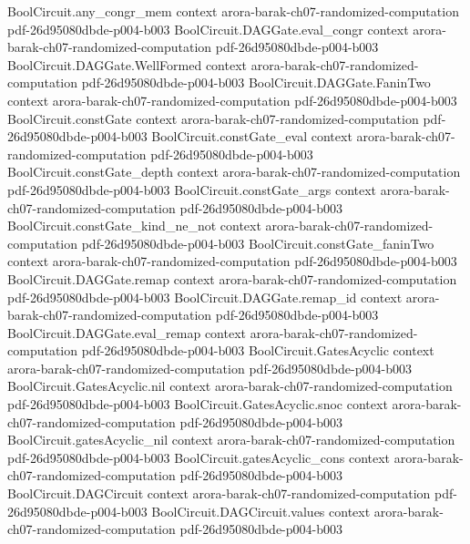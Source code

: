 \begin{theorem}
  {BoolCircuit.any_congr_mem}
  {context}
  {arora-barak-ch07-randomized-computation}
  {pdf-26d95080dbde-p004-b003}
\proofstep
  {BoolCircuit.DAGGate.eval_congr}
  {context}
  {arora-barak-ch07-randomized-computation}
  {pdf-26d95080dbde-p004-b003}
\proofstep
  {BoolCircuit.DAGGate.WellFormed}
  {context}
  {arora-barak-ch07-randomized-computation}
  {pdf-26d95080dbde-p004-b003}
\proofstep
  {BoolCircuit.DAGGate.FaninTwo}
  {context}
  {arora-barak-ch07-randomized-computation}
  {pdf-26d95080dbde-p004-b003}
\proofstep
  {BoolCircuit.constGate}
  {context}
  {arora-barak-ch07-randomized-computation}
  {pdf-26d95080dbde-p004-b003}
\proofstep
  {BoolCircuit.constGate_eval}
  {context}
  {arora-barak-ch07-randomized-computation}
  {pdf-26d95080dbde-p004-b003}
\proofstep
  {BoolCircuit.constGate_depth}
  {context}
  {arora-barak-ch07-randomized-computation}
  {pdf-26d95080dbde-p004-b003}
\proofstep
  {BoolCircuit.constGate_args}
  {context}
  {arora-barak-ch07-randomized-computation}
  {pdf-26d95080dbde-p004-b003}
\proofstep
  {BoolCircuit.constGate_kind_ne_not}
  {context}
  {arora-barak-ch07-randomized-computation}
  {pdf-26d95080dbde-p004-b003}
\proofstep
  {BoolCircuit.constGate_faninTwo}
  {context}
  {arora-barak-ch07-randomized-computation}
  {pdf-26d95080dbde-p004-b003}
\proofstep
  {BoolCircuit.DAGGate.remap}
  {context}
  {arora-barak-ch07-randomized-computation}
  {pdf-26d95080dbde-p004-b003}
\proofstep
  {BoolCircuit.DAGGate.remap_id}
  {context}
  {arora-barak-ch07-randomized-computation}
  {pdf-26d95080dbde-p004-b003}
\proofstep
  {BoolCircuit.DAGGate.eval_remap}
  {context}
  {arora-barak-ch07-randomized-computation}
  {pdf-26d95080dbde-p004-b003}
\proofstep
  {BoolCircuit.GatesAcyclic}
  {context}
  {arora-barak-ch07-randomized-computation}
  {pdf-26d95080dbde-p004-b003}
\proofstep
  {BoolCircuit.GatesAcyclic.nil}
  {context}
  {arora-barak-ch07-randomized-computation}
  {pdf-26d95080dbde-p004-b003}
\proofstep
  {BoolCircuit.GatesAcyclic.snoc}
  {context}
  {arora-barak-ch07-randomized-computation}
  {pdf-26d95080dbde-p004-b003}
\proofstep
  {BoolCircuit.gatesAcyclic_nil}
  {context}
  {arora-barak-ch07-randomized-computation}
  {pdf-26d95080dbde-p004-b003}
\proofstep
  {BoolCircuit.gatesAcyclic_cons}
  {context}
  {arora-barak-ch07-randomized-computation}
  {pdf-26d95080dbde-p004-b003}
\proofstep
  {BoolCircuit.DAGCircuit}
  {context}
  {arora-barak-ch07-randomized-computation}
  {pdf-26d95080dbde-p004-b003}
\proofstep
  {BoolCircuit.DAGCircuit.values}
  {context}
  {arora-barak-ch07-randomized-computation}
  {pdf-26d95080dbde-p004-b003}
\proofstep

\end{theorem}
